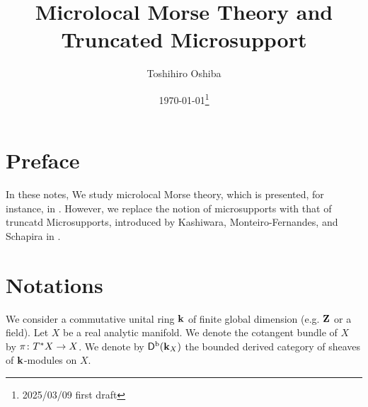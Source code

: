 \newcommand{\cotn}[1][]{\dot{T}^{\ast}{#1}}


\newcommand{\muhom}{\mu hom}
\newcommand{\muHom}[1][]{\mathrm{Hom}^\mu_{\raise1.5ex\hbox to.1em{}#1}}

\newcommand{\mucat}[2][]{\mathsf{D}^{\mathrm{b}}_{#1}(#2)}

\newcommand{\conv}[1][]{\mathbin{\mathop{\circ}\limits_{#1}}}


\newcommand{\lopen}{\mathopen{]}}
\newcommand{\lclosed}{\mathopen{[}}
\newcommand{\ropen}{\mathclose{[}}
\newcommand{\rclosed}{\mathopen{]}}

\newcommand{\sm}{\raisebox{2.33pt}{~\rule{6.4pt}{1.3pt}~}}
\newcommand{\smi}{\mathbin{\raisebox{2.33pt}{\rule{6.4pt}{1.3pt}}}}

\newcommand{\smid}{\mathrel{;}}



\title{Microlocal Morse Theory and Truncated Microsupport}
\author{Toshihiro Oshiba}
\date{\today\footnote{2025/03/09 first draft}}

\maketitle

\tableofcontents
\section*{Preface}
In these notes, 
We study microlocal Morse theory, which is presented, 
for instance, in \cite{GKS12}. 
However, we replace the notion of microsupports with
 that of truncatd Microsupports, introduced by 
Kashiwara, Monteiro-Fernandes, and Schapira in \cite{KFS03}.

\section{Notations}

We consider a commutative unital ring \(\kk\) 
of finite global dimension (e.g. \(\zz\) or a field). 
Let \(X\) be a real analytic manifold. 
We denote the cotangent bundle of \(X\) by \(
  \pi\colon \cotb[X]\to X
\). 
We denote by \(\Dompb(\kk_X)\) the bounded derived category of 
sheaves of \(\kk\)-modules on \(X\). 

